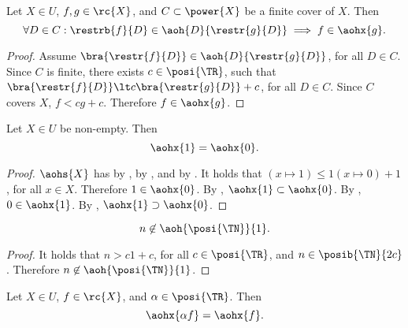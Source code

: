 \documentclass[b5paper, english, oneside]{memoir}
\begin{document}
\begin{theorem}
\label{AffineLocality}
Let $X \in U$, $f, g \in \rc{X}$, and $C \subset \power{X}$ be a finite cover of $X$. Then
\begin{equation}
\forall D \in C: \restrb{f}{D} \in \aoh{D}{\restr{g}{D}} \implies f \in \aohx{g}.
\end{equation}
\end{theorem}

\begin{proof}
Assume $\bra{\restr{f}{D}} \in \aoh{D}{\restr{g}{D}}$, for all $D \in C$. Since $C$ is finite, there exists $c \in \posi{\TR}$, such that $\bra{\restr{f}{D}} \lt c \bra{\restr{g}{D}} + c$, for all $D \in C$. Since $C$ covers $X$, $f \lt c g + c$. Therefore $f \in \aohx{g}$.
\end{proof}

\begin{theorem}
\label{AffineZeroSeparationFails}
Let $X \in U$ be non-empty. Then
\begin{equation}
\aohx{1} = \aohx{0}.
\end{equation}
\end{theorem}

\begin{proof}
$\aohs{X}$ has  by ,  by , and  by . It holds that $(x \mapsto 1) \leq 1 (x \mapsto 0) + 1$, for all $x \in X$. Therefore $1 \in \aohx{0}$. By , $\aohx{1} \subset \aohx{0}$. By , $0 \in \aohx{1}$. By , $\aohx{1} \supset \aohx{0}$.
\end{proof} 

\begin{theorem}
\label{AffineOneSeparation}
\begin{equation}
n \not\in \aoh{\posi{\TN}}{1}.
\end{equation}
\end{theorem}

\begin{proof}
It holds that $n > c 1 + c$, for all $c \in \posi{\TR}$, and $n \in \posib{\TN}{2c}$. Therefore $n \not\in \aoh{\posi{\TN}}{1}$. 
\end{proof}

\begin{theorem}
\label{AffinePositiveScaleInvariance}
Let $X \in U$, $f \in \rc{X}$, and $\alpha \in \posi{\TR}$. Then 
\begin{equation}
\aohx{\alpha f} = \aohx{f}.
\end{equation}
\end{theorem}
\end{document}

